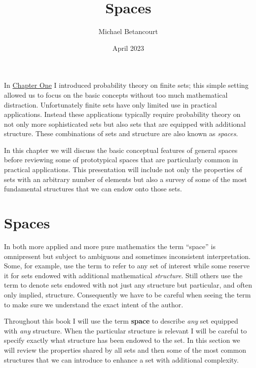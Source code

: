 \documentclass[
  letterpaper,
  DIV=11,
  numbers=noendperiod]{scrartcl}
\title{Spaces}
\author{Michael Betancourt}
\date{April 2023}
\renewcommand*\contentsname{Table of contents}
\newcommand\contentsname{Table of contents}
\begin{document}
\maketitle
\ifdefined\Shaded\renewenvironment{Shaded}{\begin{tcolorbox}[borderline west={3pt}{0pt}{shadecolor}, boxrule=0pt, enhanced, sharp corners, breakable, interior hidden, frame hidden]}{\end{tcolorbox}}\fi

\renewcommand*\contentsname{Table of contents}
{
\hypersetup{linkcolor=}
\setcounter{tocdepth}{3}
\tableofcontents
}
In
\href{https://betanalpha.github.io/assets/chapters_html/probability_on_finite_sets.html}{Chapter
One} I introduced probability theory on finite sets; this simple setting
allowed us to focus on the basic concepts without too much mathematical
distraction. Unfortunately finite sets have only limited use in
practical applications. Instead these applications typically require
probability theory on not only more sophisticated sets but also sets
that are equipped with additional structure. These combinations of sets
and structure are also known as \emph{spaces}.

In this chapter we will discuss the basic conceptual features of general
spaces before reviewing some of prototypical spaces that are
particularly common in practical applications. This presentation will
include not only the properties of sets with an arbitrary number of
elements but also a survey of some of the most fundamental structures
that we can endow onto those sets.

\hypertarget{spaces}{%
\section{Spaces}\label{spaces}}

In both more applied and more pure mathematics the term ``space'' is
omnipresent but subject to ambiguous and sometimes inconsistent
interpretation. Some, for example, use the term to refer to any set of
interest while some reserve it for sets endowed with additional
mathematical \emph{structure}. Still others use the term to denote sets
endowed with not just any structure but particular, and often only
implied, structure. Consequently we have to be careful when seeing the
term to make sure we understand the exact intent of the author.

Throughout this book I will use the term \textbf{space} to describe
\emph{any} set equipped with \emph{any} structure. When the particular
structure is relevant I will be careful to specify exactly what
structure has been endowed to the set. In this section we will review
the properties shared by all sets and then some of the most common
structures that we can introduce to enhance a set with additional
complexity.
\end{document}
